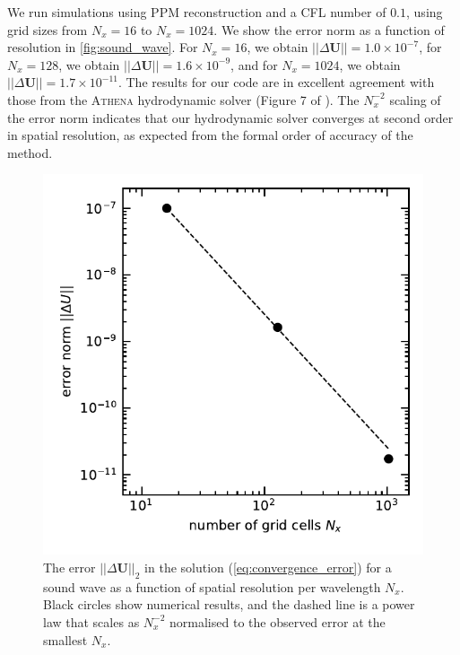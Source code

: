 \documentclass[fleqn,usenatbib]{mnras}
\newcommand{\vc}[1]{{\mathbf{#1}}}
\begin{document}
We run simulations using PPM reconstruction and a CFL number of $0.1$, using grid sizes from $N_x = 16$ to $N_x = 1024$. We show the error norm as a function of resolution in \autoref{fig:sound_wave}. For $N_x = 16$, we obtain $||\Delta \vc{U}|| = 1.0 \times 10^{-7}$, for $N_x = 128$, we obtain $||\Delta \vc{U}|| = 1.6 \times 10^{-9}$, and for $N_x = 1024$, we obtain $||\Delta \vc{U}|| = 1.7 \times 10^{-11}$. The results for our code are in excellent agreement with those from the \textsc{Athena} hydrodynamic solver (Figure 7 of \citealt{Stone_2008}). The $N_x^{-2}$ scaling of the error norm indicates that our hydrodynamic solver converges at second order in spatial resolution, as expected from the formal order of accuracy of the method.
\begin{figure}
    \includegraphics[width=\columnwidth]{wave_convergence.pdf}
    \caption{The error $||\Delta \vc{U}||_{2}$ in the solution (\autoref{eq:convergence_error}) for a sound wave as a function of spatial resolution per wavelength $N_x$. Black circles show numerical results, and the dashed line is a power law that scales as $N_x^{-2}$ normalised to the observed error at the smallest $N_x$.}
    \label{fig:sound_wave}
\end{figure}
\end{document}
